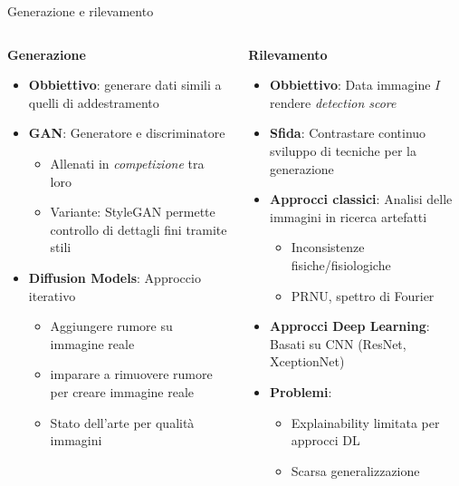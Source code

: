 \documentclass[11pt]{beamer}
\begin{document}
\begin{frame}{Generazione e rilevamento}
\begin{columns}[t]
\begin{column}{0.5\textwidth}
\textbf{Generazione}
\begin{itemize}
\item \textbf{Obbiettivo}: generare dati simili a quelli di addestramento
\item \textbf{GAN}: Generatore e discriminatore
  \begin{itemize}
  \item Allenati in \textit{competizione} tra loro
  \item Variante: StyleGAN permette controllo di dettagli fini tramite stili
  \end{itemize}
\vspace{0.1cm}
\item \textbf{Diffusion Models}: Approccio iterativo
  \begin{itemize}
  \item Aggiungere rumore su immagine reale
  \item imparare a rimuovere rumore per creare immagine reale
  \item Stato dell'arte per qualità immagini
  \end{itemize}
\end{itemize}
\end{column}
\begin{column}{0.5\textwidth}
\textbf{Rilevamento}
\begin{itemize}
\item \textbf{Obbiettivo}: Data immagine $I$ rendere \textit{detection score}
\item \textbf{Sfida}: Contrastare continuo sviluppo di tecniche per la generazione
\item \textbf{Approcci classici}: Analisi delle immagini in ricerca artefatti
  \begin{itemize}
    \item Inconsistenze fisiche/fisiologiche
    \item PRNU, spettro di Fourier
  \end{itemize}
\item \textbf{Approcci Deep Learning}: Basati su CNN (ResNet, XceptionNet)
\item \textbf{Problemi}: 
  \begin{itemize}
  \item Explainability limitata per approcci DL
  \item Scarsa generalizzazione %
  \end{itemize}
\end{itemize}
\end{column}
\end{columns}
\end{frame}
\end{document}
